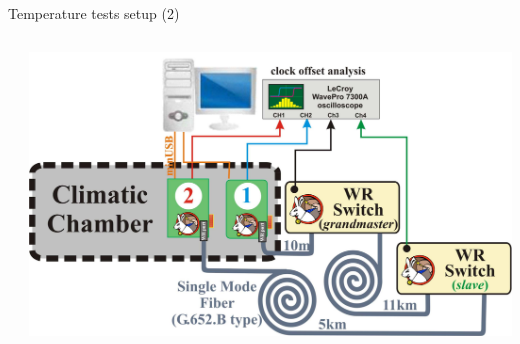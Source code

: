 \documentclass[compress,red]{beamer}
\begin{document}
\begin{frame}{Temperature tests setup (2)}
\begin{columns}[c]
\begin{center}
		\end{center}
		\vspace{-0.5cm}
		\begin{center}
		\includegraphics[width=1.0\textwidth]{measurements/tempTests-2-setup.pdf}
		\end{center}
  \end{columns}

\end{frame}
% 
\end{document}
